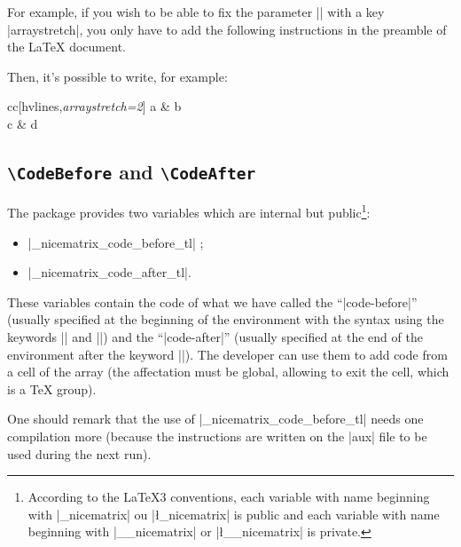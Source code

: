 \documentclass[dvipsnames]{article}
\begin{document}
\bigskip
For example, if you wish to be able to fix the parameter |\arraystretch| with
 a key |arraystretch|, you only have to add the following instructions in the preamble
of the LaTeX document.

\begin{scope}

\bigskip
\begin{Code}[execute]
\end{Code}

\bigskip
Then, it's possible to write, for example:

\medskip
\begin{Code}[width=11cm,show-output]
\begin{NiceTabular}{cc}[hvlines,\emph{arraystretch=2}]
a & b \\
c & d 
\end{NiceTabular}
\end{Code}

\end{scope}


\subsection{\texttt{\textbackslash CodeBefore} and \texttt{\textbackslash CodeAfter}}

The package  provides two variables which are internal but
public\footnote{According to the LaTeX3 conventions,
each variable with name beginning with |\g_nicematrix| ou |\l_nicematrix| is
public and each variable with name beginning with |\g__nicematrix| or
|\l__nicematrix| is private.}: 
\begin{itemize}
\item |\g_nicematrix_code_before_tl| ;
\item |\g_nicematrix_code_after_tl|.
\end{itemize}


\medskip
These variables contain the code of what we have called the ``|code-before|''
(usually specified at the beginning of the environment with the syntax using
the keywords |\CodeBefore| and |\Body|) and the ``|code-after|'' (usually
specified at the end of the environment after the keyword |\CodeAfter|). The
developer can use them to add code from a cell of the array (the affectation
must be global, allowing to exit the cell, which is a TeX group).

\medskip
One should remark that the use of |\g_nicematrix_code_before_tl| needs one
compilation more (because the instructions are written on the |aux| file to be
used during the next run).
\end{document}
